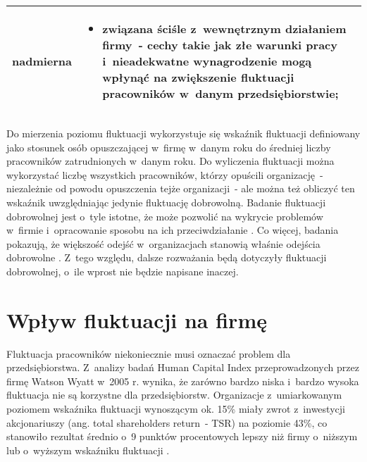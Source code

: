 \begin{minipage}{\textwidth}
\begin{table}[H]
\begin{center}
\begin{tabular}{|P{.15\textwidth}|P{.75\textwidth}|}
                         nadmierna &
                         \begin{itemize}
                             \item związana ściśle z~wewnętrznym działaniem firmy~- cechy takie jak złe warunki pracy i~nieadekwatne wynagrodzenie mogą wpłynąć na zwiększenie fluktuacji pracowników w~danym przedsiębiorstwie;
                         \end{itemize} \\
                         \hline
                     \end{tabular}
                 \end{center}
                 \raggedright{}
                 \vspace{0.75cm}
             \end{table}
\end{minipage}

Do mierzenia poziomu fluktuacji wykorzystuje się wskaźnik fluktuacji definiowany jako stosunek osób opuszczającej w~firmę w~danym roku do średniej liczby pracowników zatrudnionych w~danym roku.
Do wyliczenia fluktuacji można wykorzystać liczbę wszystkich pracowników, którzy opuścili organizację~- niezależnie od powodu opuszczenia tejże organizacji~- ale można też obliczyć ten wskaźnik uwzględniając jedynie fluktuację dobrowolną.
Badanie fluktuacji dobrowolnej jest o~tyle istotne, że może pozwolić na wykrycie problemów w~firmie i~opracowanie sposobu na ich przeciwdziałanie \cite{spychala-2019}.
Co więcej, badania pokazują, że większość odejść w~organizacjach stanowią właśnie odejścia dobrowolne \cite{dalton-1982}.
Z~tego względu, dalsze rozważania będą dotyczyły fluktuacji dobrowolnej, o~ile wprost nie będzie napisane inaczej.


\section{Wpływ fluktuacji na firmę}\label{sec:wplyw-fluktuacji-na-firme}
Fluktuacja pracowników niekoniecznie musi oznaczać problem dla przedsiębiorstwa.
Z~analizy badań Human Capital Index przeprowadzonych przez firmę Watson Wyatt w~2005 r. wynika,
że zarówno bardzo niska i~bardzo wysoka fluktuacja nie są korzystne dla przedsiębiorstw.
Organizacje z~umiarkowanym poziomem wskaźnika fluktuacji wynoszącym ok. 15\%
miały zwrot z~inwestycji akcjonariuszy (ang. total shareholders return~- TSR) na poziomie 43\%,
co stanowiło rezultat średnio o~9 punktów procentowych lepszy niż firmy o~niższym lub o~wyższym wskaźniku fluktuacji \cite{krol-ludwiczynski-2006}.

